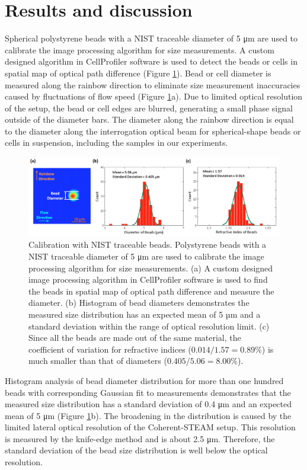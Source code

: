 \section{Results and discussion}
Spherical polystyrene beads with a NIST traceable diameter of 5 μm are used to calibrate the image processing algorithm for size measurements. A custom designed algorithm in CellProfiler software \cite{carpenter2006cellprofiler} is used to detect the beads or cells in spatial map of optical path difference (Figure \ref{fig:BOE2013_Figure3}). Bead or cell diameter is measured along the rainbow direction to eliminate size measurement inaccuracies caused by fluctuations of flow speed (Figure \ref{fig:BOE2013_Figure3}a). Due to limited optical resolution of the setup, the bead or cell edges are blurred, generating a small phase signal outside of the diameter bars. The diameter along the rainbow direction is equal to the diameter along the interrogation optical beam for spherical-shape beads or cells in suspension, including the samples in our experiments. 

\begin{figure}[htb!]
\centering
\includegraphics[scale=1]{BOE2013/Figure3.png}
\caption{Calibration with NIST traceable beads. Polystyrene beads with a NIST traceable diameter of 5 μm are used to calibrate the image processing algorithm for size measurements. (a) A custom designed image processing algorithm in CellProfiler software is used to find the beads in spatial map of optical path difference and measure the diameter. (b) Histogram of bead diameters demonstrates the measured size distribution has an expected mean of 5 µm and a standard deviation within the range of optical resolution limit. (c) Since all the beads are made out of the same material, the coefficient of variation for refractive indices ($0.014/1.57 = 0.89\%$) is much smaller than that of diameters ($0.405/5.06 = 8.00\%$).}
\label{fig:BOE2013_Figure3}
\end{figure}

Histogram analysis of bead diameter distribution for more than one hundred beads with corresponding Gaussian fit to measurements demonstrates that the measured size distribution has a standard deviation of 0.4 μm and an expected mean of 5 μm (Figure \ref{fig:BOE2013_Figure3}b). The broadening in the distribution is caused by the limited lateral optical resolution of the Coherent-STEAM setup. This resolution is measured by the knife-edge method and is about 2.5 μm. Therefore, the standard deviation of the bead size distribution is well below the optical resolution.

